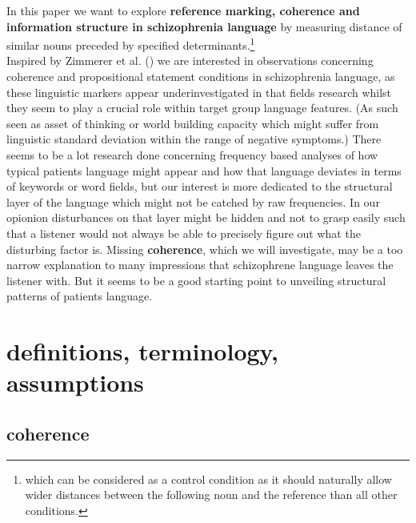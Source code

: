 \documentclass[
  12pt,
  oneside]{book}
\begin{document}
In this paper we want to explore \textbf{reference marking, coherence and information structure in schizophrenia language} by measuring distance of similar nouns preceded by specified determinants.\footnote{which can be considered as a control condition as it should naturally allow wider distances between the following noun and the reference than all other conditions.}\\
Inspired by Zimmerer et al. () we are interested in observations concerning coherence and propositional statement conditions in schizophrenia language, as these linguistic markers appear underinvestigated in that fields research whilst they seem to play a crucial role within target group language features. (As such seen as asset of thinking or world building capacity which might suffer from linguistic standard deviation within the range of negative symptoms.) There seems to be a lot research done concerning frequency based analyses of how typical patients language might appear and how that language deviates in terms of keywords or word fields, but our interest is more dedicated to the structural layer of the language which might not be catched by raw frequencies. In our opionion disturbances on that layer might be hidden and not to grasp easily such that a listener would not always be able to precisely figure out what the disturbing factor is. Missing \textbf{coherence}, which we will investigate, may be a too narrow explanation to many impressions that schizophrene language leaves the listener with. But it seems to be a good starting point to unveiling structural patterns of patients language.

\section{definitions, terminology, assumptions}\label{definitions-terminology-assumptions}

\subsection{coherence}\label{coherence}
\end{document}
